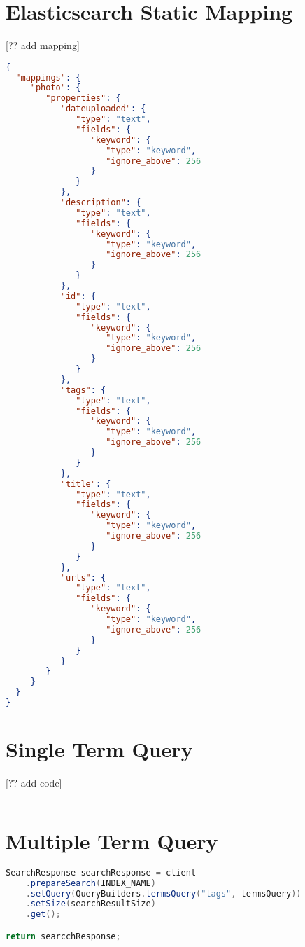 \section{Elasticsearch Static Mapping}
[?? add mapping]
\begin{lstlisting}[language={json}, caption={The static Elasticsearch mapping used on the photo index in the experiment setup.}, label={ap:elasticsearch-mapping}]
{
  "mappings": {
     "photo": {
        "properties": {
           "dateuploaded": {
              "type": "text",
              "fields": {
                 "keyword": {
                    "type": "keyword",
                    "ignore_above": 256
                 }
              }
           },
           "description": {
              "type": "text",
              "fields": {
                 "keyword": {
                    "type": "keyword",
                    "ignore_above": 256
                 }
              }
           },
           "id": {
              "type": "text",
              "fields": {
                 "keyword": {
                    "type": "keyword",
                    "ignore_above": 256
                 }
              }
           },
           "tags": {
              "type": "text",
              "fields": {
                 "keyword": {
                    "type": "keyword",
                    "ignore_above": 256
                 }
              }
           },
           "title": {
              "type": "text",
              "fields": {
                 "keyword": {
                    "type": "keyword",
                    "ignore_above": 256
                 }
              }
           },
           "urls": {
              "type": "text",
              "fields": {
                 "keyword": {
                    "type": "keyword",
                    "ignore_above": 256
                 }
              }
           }
        }
     }
  }
}
\end{lstlisting}

\section{Single Term Query}
[?? add code]
\begin{lstlisting}[language={java}, caption={Java code used to search for a single term.}, label={ap:single-term-query}]

\end{lstlisting}

\section{Multiple Term Query}
\begin{lstlisting}[language={java}, caption={Java code used to search for multiple terms.}, label={ap:multiple-term-query}]
SearchResponse searchResponse = client
    .prepareSearch(INDEX_NAME)
    .setQuery(QueryBuilders.termsQuery("tags", termsQuery))
    .setSize(searchResultSize)
    .get();

return searcchResponse;
\end{lstlisting}

